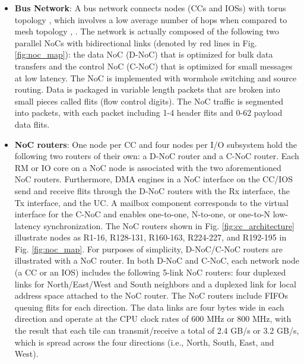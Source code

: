 \begin{itemize}
  \setlength{\leftskip}{-5mm}
  \item \textbf{Bus Network}:
  A bus network connects nodes (CCs and IOSs) with torus topology \cite{dally2001route}, which  involves a low average number of hops when compared to mesh topology \cite{vangal200780}, \cite{taylor2002raw}.
  The network is actually composed of the following two parallel NoCs with bidirectional links (denoted by red lines in Fig. \ref{fig:noc_map}):
  the data NoC (D-NoC) that is optimized for bulk data transfers and the control NoC (C-NoC) that is optimized for small messages at low latency.
  The NoC is implemented with wormhole switching and source routing.
  Data is packaged in variable length packets that are broken into small pieces called flits (flow control digits).
  The NoC traffic is segmented into packets, with each packet including 1-4 header flits and 0-62 payload data flits.
  
  \item \textbf{NoC routers}:
  One node per CC and four nodes per I/O subsystem hold the following two routers of their own: a D-NoC router and a C-NoC router.
  Each RM or IO core on a NoC node is associated with the two aforementioned  NoC routers.
  Furthermore, DMA engines in a NoC interface on the CC/IOS send and receive flits through the D-NoC routers with the Rx interface, the Tx interface, and the UC.
  A mailbox component corresponds to the virtual interface for the C-NoC and enables one-to-one, N-to-one, or one-to-N low-latency synchronization.
  The NoC routers shown in Fig. \ref{fig:cc_architecture} illustrate nodes as R1-16, R128-131, R160-163, R224-227, and R192-195 in Fig. \ref{fig:noc_map}.
  For purposes of simplicity, D-NoC/C-NoC routers are illustrated with a NoC router.
  In both D-NoC and C-NoC, each network node (a CC or an IOS)  includes the following 5-link NoC routers:
  four duplexed links for North/East/West and South neighbors and a duplexed link for local address space attached to the NoC router.
  The NoC routers include FIFOs queuing flits for each direction.
  The data links are four bytes wide in each direction and operate at the CPU clock rates of 600 MHz or 800 MHz, with the result that each tile can transmit/receive a total of 2.4 GB/s or 3.2 GB/s, which is spread across the four directions (i.e., North, South, East, and West).
\end{itemize}  

